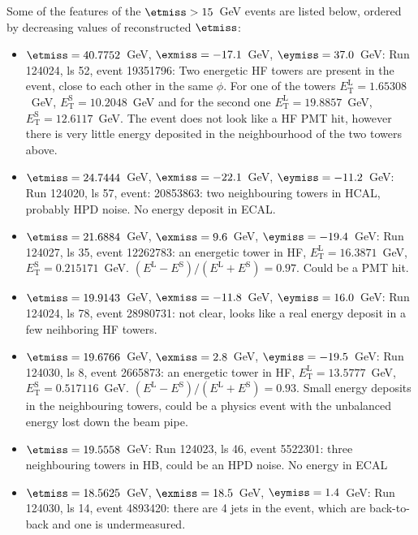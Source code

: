 Some of the features of the $\etmiss>15$~GeV events are listed below,
ordered by decreasing values of reconstructed $\etmiss$:
\begin{itemize}
\item $\etmiss=40.7752$~GeV, $\exmiss=-17.1$~GeV, $\eymiss=37.0$~GeV:
  Run 124024, ls 52, event 19351796: Two energetic HF towers are present
  in the event, close to each other in the same $\phi$. For one of the
  towers $E_\text{T}^\text{L}=1.65308$~GeV, $E_\text{T}^\text{S}=10.2048$~GeV and for the
  second one $E_\text{T}^\text{L}=19.8857$~GeV, $E_\text{T}^\text{S}=12.6117$~GeV. The event
  does not look like a HF PMT hit, however there is very little energy
  deposited in the neighbourhood of the two towers above.

\item $\etmiss=24.7444$~GeV, $\exmiss=-22.1$~GeV, $\eymiss=-11.2$~GeV:
  Run 124020, ls 57, event: 20853863: two neighbouring towers in HCAL,
  probably HPD noise. No energy deposit in ECAL.

\item $\etmiss=21.6884$~GeV, $\exmiss=9.6$~GeV, $\eymiss=-19.4$~GeV: Run
  124027, ls 35, event 12262783: an energetic tower in HF,
  $E_\text{T}^\text{L}=16.3871$~GeV,
  $E_\text{T}^\text{S}=0.215171$~GeV. $(E^\text{L}-E^\text{S})/(E^\text{L}+E^\text{S})=0.97$. Could be a PMT hit.

\item $\etmiss=19.9143$~GeV, $\exmiss=-11.8$~GeV, $\eymiss=16.0$~GeV:
  Run 124024, ls 78, event 28980731: not clear, looks like a real energy
  deposit in a few neihboring HF towers.

\item $\etmiss=19.6766$~GeV, $\exmiss=2.8$~GeV, $\eymiss=-19.5$~GeV: Run
  124030, ls 8, event 2665873: an energetic tower in HF, $E_\text{T}^\text{L}=
  13.5777$~GeV, $E_\text{T}^\text{S}=0.517116$~GeV. $(E^\text{L}-E^\text{S})/(E^\text{L}+E^\text{S})=0.93$. Small
  energy deposits in the neighbouring towers, could be a physics event
  with the unbalanced energy lost down the beam pipe.

\item $\etmiss=19.5558 $~GeV: Run 124023, ls 46, event 5522301: three
  neighbouring towers in HB, could be an HPD noise. No energy in ECAL

\item $\etmiss=18.5625$~GeV, $\exmiss=18.5$~GeV, $\eymiss=1.4$~GeV: Run
  124030, ls 14, event 4893420: there are 4 jets in the event, which are
  back-to-back and one is undermeasured.


\end{itemize}
